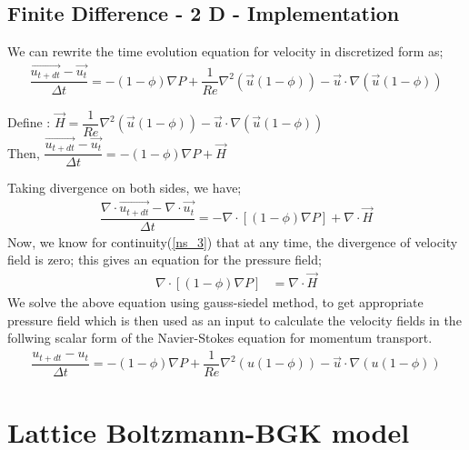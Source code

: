 \documentclass[12pt,a4paper]{report}
\begin{document}
\subsection{Finite Difference - 2 D - Implementation}
We can rewrite the time evolution equation for 
velocity in discretized form as;
\begin{align}
	\dfrac{\vec{u_{t+dt}} - \vec{u_t}}{\Delta t} = -(1-\phi)\nabla P + \dfrac{1}{Re}\nabla^2\left(\vec{u}(1-\phi)\right) - \vec{u}\cdot\nabla\left(\vec{u}(1-\phi)\right) 
\end{align}
\begin{center}
Define : $\vec{H} = \dfrac{1}{Re}\nabla^2\left(\vec{u}(1-\phi)\right) - \vec{u}\cdot\nabla\left(\vec{u}(1-\phi)\right)$\\
Then, $	\dfrac{\vec{u_{t+dt}} - \vec{u_t}}{\Delta t} = -(1-\phi)\nabla P + \vec{H} $
\end{center}
Taking divergence on both sides, we have;
\begin{align}
	\dfrac{\nabla\cdot\vec{u_{t+dt}} - \nabla\cdot\vec{u_t}}{\Delta t} = -\nabla\cdot\left[(1-\phi)\nabla P\right] + \nabla\cdot\vec{H}	
\end{align}
Now, we know for continuity(\ref{ns_3}) that at any time,
the divergence of velocity field is zero; this gives an 
equation for the pressure field;
\begin{align}
	\nabla\cdot\left[(1-\phi)\nabla P\right] &= \nabla\cdot\vec{H} 
\end{align}
We solve the above equation using gauss-siedel method, to get 
appropriate pressure field which is then used as an input to 
calculate the velocity fields in the follwing scalar form of 
the Navier-Stokes equation for momentum transport.
\begin{align}
	\dfrac{u_{t+dt} - u_t}{\Delta t} = -(1-\phi)\nabla P + \dfrac{1}{Re}\nabla^2\left(u(1-\phi)\right) - \vec{u}\cdot\nabla\left(u(1-\phi)\right) 
\end{align}
\section{Lattice Boltzmann-BGK model}
\end{document}
